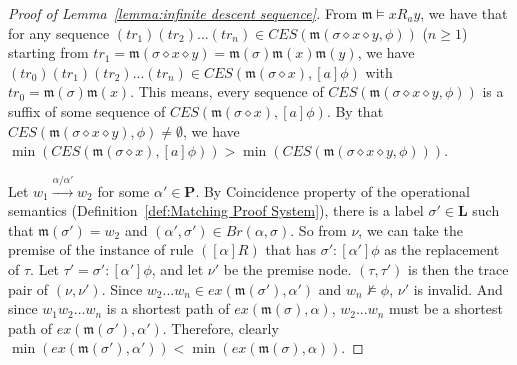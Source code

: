 \documentclass[manuscript,screen]{acmart}
\newcommand{\bff}[1]{\mathbf{#1}}
\newcommand{\mfr}[1]{\mathfrak{#1}}
\newcommand{\Conf}[0]{\bff{L}}
\newcommand{\Prog}[0]{\bff{P}}
\newcommand{\pmult}[0]{\prec_m}
\newcommand{\lm}[0]{\mfr{m}}
\newcommand{\EX}[0]{\textit{CES}}
\newcommand{\ex}[0]{\textit{ex}}
\newcommand{\cat}[0]{\diamond}
\begin{document}
\begin{proof}[Proof of Lemma~\ref{lemma:infinite descent sequence}]
    \ifx
    From $\lm\models xR_a y$, we have that for any sequence $(tr_1)(tr_2)...(tr_n)\in \EX(\lm(\sigma\cat x\cat y, \phi))$ ($n\ge 1$) starting from $tr_1 = \lm(\sigma\cat x\cat y) = \lm(\sigma)\lm(x)\lm(y)$, 
    we have $(tr_0)(tr_1)(tr_2)...(tr_n)\in \EX(\lm(\sigma\cat x), [a]\phi)$ with $tr_0 = \lm(\sigma)\lm(x)$.  
    This means, every sequence of $\EX(\lm(\sigma\cat x\cat y, \phi))$ is a suffix of some sequence of $\EX(\lm(\sigma\cat x), [a]\phi)$. 
    By that $\EX(\lm(\sigma\cat x\cat y), \phi)\neq \emptyset$, we have $\min(\EX(\lm(\sigma\cat x), [a]\phi)) > \min(\EX(\lm(\sigma\cat x\cat y, \phi)))$. 
    \fi
    
    \ifx
    Let $w_1\xrightarrow{\alpha/\alpha'}w_2$ for some $\alpha'\in \Prog$. 
    By Coincidence property of the operational semantics (Definition~\ref{def:Matching Proof System}), 
    there is a label $\sigma'\in \Conf$ such that $\lm(\sigma') = w_2$ and $(\alpha', \sigma')\in Br(\alpha, \sigma)$. 
    So from $\nu$, we can take the premise of the instance of rule $([\alpha]R)$ that has $\sigma' : [\alpha']\phi$ as the replacement of $\tau$. 
    Let $\tau' = \sigma' : [\alpha']\phi$, and let $\nu'$ be the premise node. 
    $(\tau, \tau')$ is then the trace pair of $(\nu, \nu')$. 
    Since $w_2...w_n\in \ex(\lm(\sigma'), \alpha')$ and $w_n\not\models \phi$, $\nu'$ is invalid. 
    And since $w_1w_2...w_n$ is a shortest path of $\ex(\lm(\sigma), \alpha)$, $w_2...w_n$ must be a shortest path of $\ex(\lm(\sigma'), \alpha')$. 
    Therefore, clearly $\min(\ex(\lm(\sigma'), \alpha')) < \min(\ex(\lm(\sigma), \alpha))$. 


\end{proof}
\end{document}
